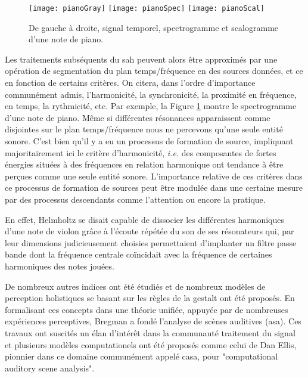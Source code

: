 \begin{figure}
  \texttt{[image: pianoGray]}
  \texttt{[image: pianoSpec]}
  \texttt{[image: pianoScal]}
  \caption{De gauche à droite, signal temporel, spectrogramme et scalogramme d'une note de piano.}
  \label{fig:piano}
\end{figure}

Les traitements subséquents du sah peuvent alors être approximés par une opération de segmentation du plan temps/fréquence en des sources données, et ce en fonction de certains critères.  On citera, dans l'ordre d'importance communément admis, l'harmonicité, la synchronicité, la proximité en fréquence, en temps, la rythmicité, etc. Par exemple, la Figure \ref{fig:piano} montre le spectrogramme d'une note de piano. Même si différentes résonances apparaissent comme disjointes sur le plan temps/fréquence nous ne percevons qu'une seule entité sonore. C'est bien qu'il y a eu un processus de formation de source, impliquant majoritairement ici le critère d'harmonicité, \textit{i.e.} des composantes de fortes énergies situées à des fréquences en relation harmonique ont tendance à être perçues comme une seule entité sonore. L'importance relative de ces critères dans ce processus de formation de sources peut être modulée dans une certaine mesure par des processus descendants comme l'attention ou encore la pratique.

En effet, Helmholtz se disait capable de dissocier les différentes harmoniques d'une note de violon grâce à l'écoute répétée du son de ses résonateurs qui, par leur dimensions judicieusement choisies permettaient d'implanter un filtre passe bande dont la fréquence centrale coïncidait avec la fréquence de certaines harmoniques des notes jouées.

De nombreux autres indices ont été étudiés et de nombreux modèles de perception holistiques se basant sur les règles de la gestalt\cite{koffka2013principles} ont été proposés. En formalisant ces concepts dans une théorie unifiée, appuyée par de nombreuses expériences perceptives, Bregman a fondé l'analyse de scènes auditives (asa)\cite{bregman1994auditory}. Ces travaux ont suscités un élan d'intérêt dans la communauté traitement du signal et plusieurs modèles computationels ont été proposés comme celui de Dan Ellis\cite{ellis1996prediction}, pionnier dans ce domaine communément appelé casa, pour "computational auditory scene analysis".

